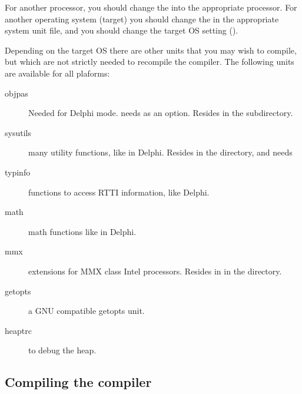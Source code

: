 \documentclass{report}
\begin{document}
For another processor, you should change the  into the appropriate
processor. For another operating system (target) you should change the
 in the appropriate system unit file, and you should change
the target OS setting ().

Depending on the target OS there are other units that you may wish to
compile, but which are not strictly needed to recompile the compiler. 
The following units are available for all plaforms: 
\begin{description}
\item[objpas] Needed for Delphi mode. needs  as an option. Resides
in the  subdirectory.
\item[sysutils] many utility functions, like in Delphi. Resides in the
 directory, and needs 
\item[typinfo] functions to access RTTI information, like Delphi. 
\item[math] math functions like in Delphi.
\item[mmx] extensions for MMX class Intel processors. Resides in
in the  directory.
\item[getopts] a GNU compatible getopts unit.
\item[heaptrc] to debug the heap.
\end{description} 

\subsection{Compiling the compiler}
\end{document}
